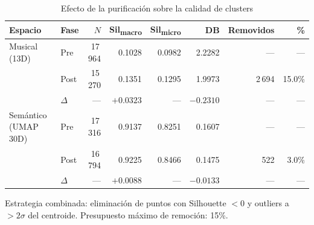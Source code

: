 \begin{table}[htbp]
  \centering
  \caption{Efecto de la purificación sobre la calidad de clusters}
  \label{tab:purification_results}
  \begin{tabular}{llrrrrrr}
    \toprule
    Espacio & Fase & $N$ & Sil\textsubscript{macro} & Sil\textsubscript{micro} & DB & Removidos & \% \\
    \midrule
    Musical (13D) & Pre & 17\,964 & 0.1028 & 0.0982 & 2.2282 & --- & --- \\
    & Post & 15\,270 & 0.1351 & 0.1295 & 1.9973 & 2\,694 & 15.0\% \\
    & $\Delta$ & --- & $+0.0323$ & --- & $-0.2310$ & --- & --- \\
    \midrule
    Semántico (UMAP 30D) & Pre & 17\,316 & 0.9137 & 0.8251 & 0.1607 & --- & --- \\
    & Post & 16\,794 & 0.9225 & 0.8466 & 0.1475 & 522 & 3.0\% \\
    & $\Delta$ & --- & $+0.0088$ & --- & $-0.0133$ & --- & --- \\
    \bottomrule
  \end{tabular}
  \begin{tablenotes}[flushleft]
    \small
    \item Estrategia combinada: eliminación de puntos con Silhouette $< 0$ y outliers a $> 2\sigma$ del centroide. Presupuesto máximo de remoción: 15\%.
  \end{tablenotes}
\end{table}